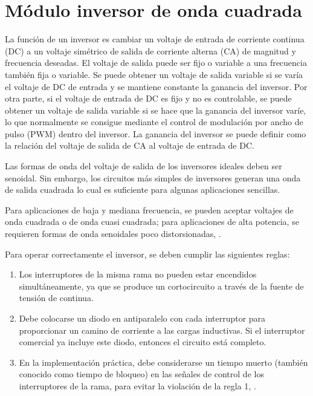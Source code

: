 \section{Módulo inversor de onda cuadrada}

La función de un inversor es cambiar un voltaje de entrada de corriente continua (DC) a un voltaje simétrico de salida de corriente alterna (CA) de magnitud y frecuencia deseadas. El voltaje de salida puede ser fijo o variable a una frecuencia también fija o variable. Se puede obtener un voltaje de salida variable si se varía el voltaje de DC de entrada y se mantiene constante la ganancia del inversor. Por otra parte, si el voltaje de entrada de DC es fijo y no es controlable, se puede obtener un voltaje de salida variable si se hace que la ganancia del inversor varíe, lo que normalmente se consigue mediante el control de modulación por ancho de pulso (PWM) dentro del inversor. La ganancia del inversor se puede definir como la relación del voltaje de salida de CA al voltaje de entrada de DC.

Las formas de onda del voltaje de salida de los inversores ideales deben ser senoidal. Sin embargo, los circuitos más simples de inversores generan una onda de salida cuadrada lo cual es suficiente para algunas aplicaciones sencillas.
 
Para aplicaciones de baja y mediana frecuencia, se pueden aceptar voltajes de onda cuadrada o de onda cuasi cuadrada; para aplicaciones de alta potencia, se requieren formas de onda senoidales poco distorsionadas, \Parencite{RASHID-SPANISH}.

Para operar correctamente el inversor, se deben cumplir las siguientes reglas: 

\begin{enumerate}[noitemsep]
    \item Los interruptores de la misma rama no pueden estar encendidos simultáneamente, ya que se produce un cortocircuito a través de la fuente de tensión de continua.
    \item Debe colocarse un diodo en antiparalelo con cada interruptor para proporcionar un camino de corriente a las cargas inductivas. Si el interruptor comercial ya incluye este diodo, entonces el circuito está completo.
    \item En la implementación práctica, debe considerarse un tiempo muerto (también conocido como tiempo de bloqueo) en las señales de control de los interruptores de la rama, para evitar la violación de la regla 1, \parencite{RASHID}.
\end{enumerate}

